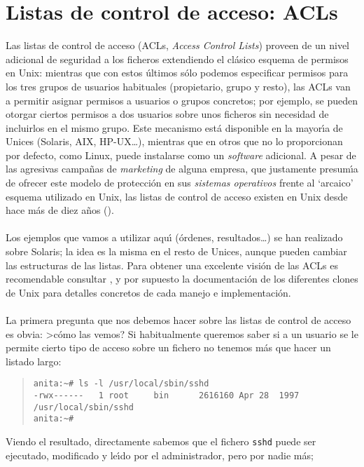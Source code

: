 \section{Listas de control de acceso: ACLs}
Las listas de control de acceso (ACLs, {\it Access Control Lists}) proveen
de un nivel adicional de seguridad a los ficheros extendiendo el cl\'asico
esquema de permisos en Unix: mientras que con estos \'ultimos s\'olo podemos 
especificar permisos para los tres grupos de usuarios habituales (propietario, 
grupo y resto), las ACLs van a permitir asignar permisos a usuarios o grupos
concretos; por ejemplo, se
pueden otorgar ciertos permisos a dos usuarios sobre unos ficheros sin necesidad
de incluirlos en el mismo grupo. Este mecanismo est\'a
disponible en la mayor\'{\i}a de Unices (Solaris, AIX, HP-UX\ldots), mientras
que en otros que no lo proporcionan por defecto, como Linux, puede instalarse 
como un {\it software} adicional. A pesar de las agresivas campa\~nas de 
{\it marketing} de alguna empresa, que justamente presum\'{\i}a de ofrecer este 
modelo de protecci\'on en sus {\it sistemas operativos} frente al `arcaico' 
esquema utilizado en Unix, las listas de control de acceso existen en Unix 
desde hace m\'as de diez a\~nos (\cite{kn:apo88}).\\
\\Los ejemplos que vamos a utilizar aqu\'{\i} (\'ordenes, resultados\ldots) se
han realizado sobre Solaris; la idea es la misma en el resto de Unices, aunque 
pueden cambiar las estructuras de las listas. Para obtener una excelente 
visi\'on de las ACLs es recomendable consultar \cite{kn:fri95}, y por supuesto
la documentaci\'on de los diferentes clones de Unix para detalles concretos de 
cada manejo e implementaci\'on.\\
\\La primera pregunta que nos debemos hacer sobre las listas de control de
acceso es obvia: >c\'omo las vemos? Si habitualmente queremos saber si a un 
usuario se le permite cierto tipo de acceso sobre un fichero no tenemos m\'as 
que hacer un listado largo:
\begin{quote}
\begin{verbatim}
anita:~# ls -l /usr/local/sbin/sshd 
-rwx------   1 root     bin      2616160 Apr 28  1997 /usr/local/sbin/sshd
anita:~# 
\end{verbatim}
\end{quote}
Viendo el resultado, directamente sabemos que el fichero {\tt sshd} puede ser
ejecutado, modificado y le\'{\i}do por el administrador, pero por nadie m\'as;
